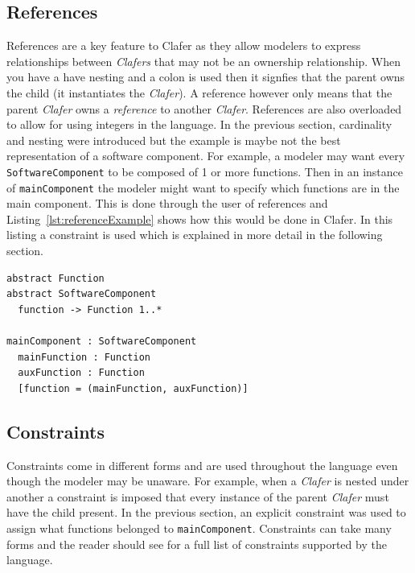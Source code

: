 \documentclass[10pt,oneside]{IEEEtran}
\begin{document}
\subsection{References}
References are a key feature to Clafer as they allow modelers to express relationships between
\textit{Clafers} that may not be an ownership relationship. When you have a have nesting and a colon is used then it signfies that the parent owns the child (it instantiates the \textit{Clafer}). A reference however only means that the parent \textit{Clafer} owns a \textit{reference} to another \textit{Clafer}. References are also overloaded to allow for using integers in the language. In the previous section, cardinality and nesting were introduced but the example is maybe not the best representation of a software component. For example, a modeler may want every \lstinline$SoftwareComponent$ to be composed of 1 or more functions. Then in an instance of \lstinline$mainComponent$ the modeler might want to specify which functions are in the main component. This is done through the user of references and Listing~\ref{lst:referenceExample} shows how this would be done in Clafer. In this listing a constraint is used which is explained in more detail in the following section.

\begin{lstlisting}[label={lst:referenceExample},caption={Example use of references}]
abstract Function
abstract SoftwareComponent
  function -> Function 1..*

mainComponent : SoftwareComponent
  mainFunction : Function
  auxFunction : Function
  [function = (mainFunction, auxFunction)]
\end{lstlisting}

\subsection{Constraints}
Constraints come in different forms and are used throughout the language even though the modeler may be
unaware. For example, when a \textit{Clafer} is nested under another a constraint is imposed that every
instance of the parent \textit{Clafer} must have the child present. In the previous section, an explicit
constraint was used to assign what functions belonged to \lstinline$mainComponent$. Constraints can
take many forms and the reader should see \cite{1} for a full list of constraints
supported by the language.
\end{document}
